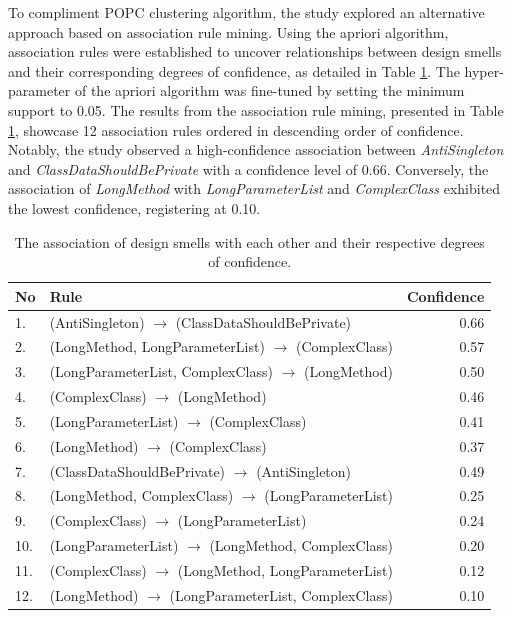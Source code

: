 \documentclass[AMA,Times1COL]{WileyNJDv5} %
\begin{document}
	To compliment POPC clustering algorithm, the study explored an alternative approach based on association rule mining. Using the apriori algorithm, association rules were established to uncover relationships between design smells and their corresponding degrees of confidence, as detailed in Table \ref{table:assoc_ds_ds}. The hyper-parameter of the apriori algorithm was fine-tuned by setting the minimum support to 0.05. The results from the association rule mining, presented in Table \ref{table:assoc_ds_ds}, showcase 12 association rules ordered in descending order of confidence. Notably, the study observed a high-confidence association between \textit{AntiSingleton} and \textit{ClassDataShouldBePrivate} with a confidence level of 0.66. Conversely, the association of \textit{LongMethod} with \textit{LongParameterList} and \textit{ComplexClass} exhibited the lowest confidence, registering at 0.10.
		\begin{table}[h!]
		\centering %
		\caption{The  association of design smells with each other and their respective degrees of confidence.} %
		\begin{tabular*}{350pt}{@{\extracolsep\fill}llr@{\extracolsep\fill}}%
			
			\toprule
			\textbf{No} & \textbf{Rule} &\textbf{ Confidence}  \\
			\midrule
			1. &(AntiSingleton) $\rightarrow$ (ClassDataShouldBePrivate) & 0.66 \\
			2. &(LongMethod, LongParameterList)	 $\rightarrow$ (ComplexClass) & 0.57 \\
			3. &(LongParameterList, ComplexClass) $\rightarrow$ (LongMethod)  & 0.50 \\
			4. &(ComplexClass) $\rightarrow$ (LongMethod) & 0.46 \\
			5. &(LongParameterList)	 $\rightarrow$ (ComplexClass) & 0.41 \\
			6. &(LongMethod) $\rightarrow$ (ComplexClass) & 0.37 \\
			7. &(ClassDataShouldBePrivate) $\rightarrow$ (AntiSingleton) & 0.49 \\
			8. &(LongMethod, ComplexClass) $\rightarrow$ (LongParameterList) & 0.25 \\
			9. &(ComplexClass) $\rightarrow$ (LongParameterList) & 0.24 \\
			10. &(LongParameterList)	 $\rightarrow$ (LongMethod, ComplexClass) & 0.20 \\
			11. &(ComplexClass)	 $\rightarrow$ (LongMethod, LongParameterList) & 0.12 \\
			12. &(LongMethod) $\rightarrow$ (LongParameterList, ComplexClass) & 0.10 \\
			\bottomrule
		\end{tabular*}
		\label{table:assoc_ds_ds}
	\end{table} 
	
\end{document}
